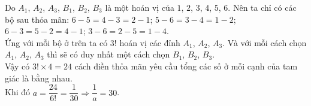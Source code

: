 \begin{ex}
{{}\noindent
Do $A_1$, $A_2$, $A_3$,  $B_1$, $B_2$, $B_3$ là một hoán vị của $1$, $2$, $3$, $4$, $5$, $6$.
Nên ta chỉ có các bộ sau thỏa mãn: $6-5 = 4-3 = 2-1$; $5-6 = 3-4 = 1-2$; $6-3 = 5-2 = 4-1$; $3-6 = 2-5 = 1-4$.\\
Ứng với mỗi bộ ở trên ta có $3!$ hoán vị các đỉnh $A_1$, $A_2$, $A_3$.
Và với mỗi cách chọn $A_1$, $A_2$, $A_3$ thì sẽ có duy nhất một cách chọn $B_1$, $B_2$, $B_3$.\\
Vậy có $3!\times 4=24$ cách điền thỏa mãn yêu cầu  tổng các số ở mỗi cạnh của tam giác là bằng nhau.\\
Khi đó $a=\dfrac{\mathrm{24}}{6!}=\dfrac{1}{30}\Rightarrow \dfrac{1}{a}=30$.
}
\end{ex}

